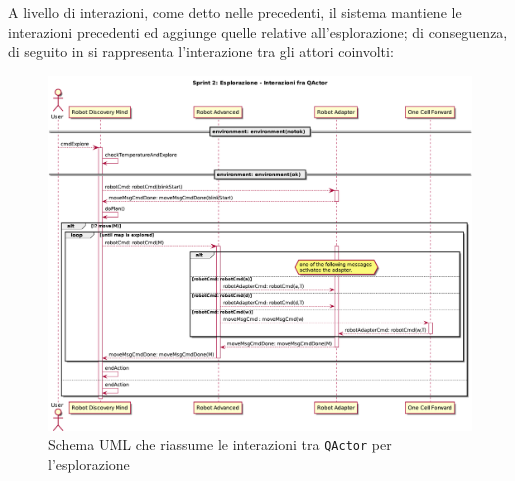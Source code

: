 


A livello di interazioni, come detto nelle  precedenti, il sistema mantiene le interazioni precedenti ed aggiunge quelle relative all'esplorazione;
di conseguenza, di seguito in  si rappresenta l'interazione tra gli attori coinvolti:

\begin{figure}[H]
  \centering
  \includegraphics[width=\textwidth]{res/sprint2/explore}
  \caption{Schema UML che riassume le interazioni tra \texttt{QActor} per l'esplorazione}%
  \label{fig:sp2:explore}
\end{figure}


